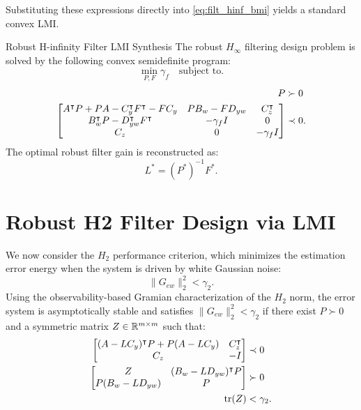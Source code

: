 Substituting these expressions directly into \eqref{eq:filt_hinf_bmi} yields a standard convex LMI.

\begin{mytheorem}{Robust H-infinity Filter LMI Synthesis}
The robust $H_\infty$ filtering design problem is solved by the following convex semidefinite program:
\begin{equation}
\min_{P, F} \gamma_f \quad \text{subject to} .
\end{equation}
\begin{align}
    P &\succ 0 \\
    \begin{bmatrix} A^\intercal P + P A - C_y^\intercal F^\intercal - F C_y & P B_w - F D_{yw} & C_z^\intercal \\ B_w^\intercal P - D_{yw}^\intercal F^\intercal & -\gamma_f I & 0 \\ C_z & 0 & -\gamma_f I \end{bmatrix} &\prec 0 . \label{eq:filt_hinf_lmi}
\end{align}
The optimal robust filter gain is reconstructed as:
\begin{equation}
L^* = (P^*)^{-1} F^* .
\end{equation}
\end{mytheorem}

\section{Robust H2 Filter Design via LMI}
We now consider the $H_2$ performance criterion, which minimizes the estimation error energy when the system is driven by white Gaussian noise:
\begin{equation}
\| G_{ew} \|_2^2 < \gamma_2 .
\end{equation}
Using the observability-based Gramian characterization of the $H_2$ norm, the error system is asymptotically stable and satisfies $\| G_{ew} \|_2^2 < \gamma_2$ if there exist $P \succ 0$ and a symmetric matrix $Z \in \mathbb{R}^{m \times m}$ such that:
\begin{align}
    \begin{bmatrix} (A - L C_y)^\intercal P + P (A - L C_y) & C_z^\intercal \\ C_z & -I \end{bmatrix} &\prec 0 \label{eq:filt_h2_bmi_1} \\
    \begin{bmatrix} Z & (B_w - L D_{yw})^\intercal P \\ P (B_w - L D_{yw}) & P \end{bmatrix} &\succ 0 \label{eq:filt_h2_bmi_2} \\
\operatorname{tr}(Z) &< \gamma_2 .
\end{align}

